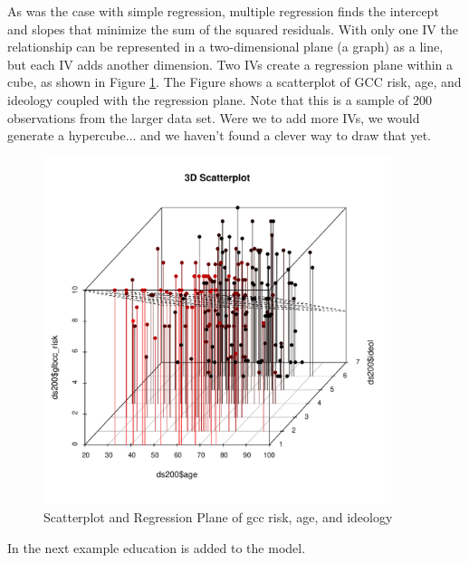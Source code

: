 \documentclass[11pt,openany]{book}\usepackage[]{graphicx}\usepackage[]{color}
\begin{document}
As was the case with simple regression, multiple regression finds the intercept and slopes that minimize the sum of the squared residuals. With only one IV the relationship can be represented in a two-dimensional plane (a graph) as a line, but each IV adds another dimension. Two IVs create a regression plane within a cube, as shown in Figure \ref{fig:scatols}. The Figure shows a scatterplot of GCC risk, age, and ideology coupled with the regression plane. Note that this is a sample of 200 observations from the larger data set. Were we to add more IVs, we would generate a hypercube... and we haven't found a clever way to draw that yet.



\begin{figure}
  \centering
  \includegraphics[width=4in]{12_LogicMult/scatols.pdf}%
  \caption{Scatterplot and Regression Plane of gcc risk, age, and
    ideology \label{fig:scatols}}
\end{figure}

In the next example education is added to the model. 
\end{document}
